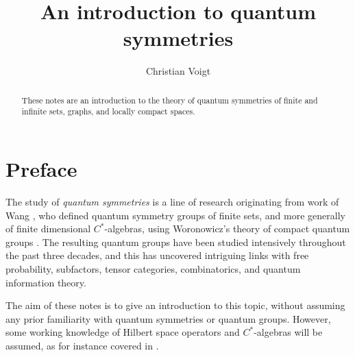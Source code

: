 \documentclass[a4paper]{amsart}
\numberwithin{equation}{section}
\theoremstyle{change}
\begin{document}
\title{An introduction to quantum symmetries}

\author{Christian Voigt}
\address{School of Mathematics and Statistics \\
         University of Glasgow \\
         University Place \\
         Glasgow G12 8QQ \\
         United Kingdom} 



\maketitle

\begin{abstract}
These notes are an introduction to the theory of quantum symmetries of finite and infinite sets, graphs, and locally compact spaces. 
\end{abstract}


\section{Preface} 

The study of \emph{quantum symmetries} is a line of research originating from work of Wang 
\cite{WANG_quantumsymmetry}, who defined quantum symmetry groups of finite sets, and more generally of finite dimensional $ C^* $-algebras, using Woronowicz's theory of compact quantum groups \cite{WORONOWICZ_compactquantumgroups}. The resulting quantum groups have been studied intensively throughout the past three decades, and this has uncovered intriguing links with free probability, subfactors, tensor categories, combinatorics, and quantum information theory.  

The aim of these notes is to give an introduction to this topic, without assuming any prior familiarity with quantum symmetries or quantum groups. 
However, some working knowledge of Hilbert space operators and $ C^* $-algebras will be assumed, as for instance covered in \cite{MURPHY_book}. 
\end{document}
